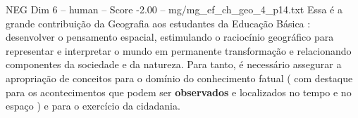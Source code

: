 \begin{textsample}{NEG Dim 6 – human – Score -2.00 – mg/mg\_ef\_ch\_geo\_4\_p14.txt}  \label{ex:f6_neg_019}
Essa é a grande contribuição da Geografia aos estudantes da Educação Básica : desenvolver o pensamento espacial, estimulando o raciocínio geográfico para representar e interpretar o mundo em permanente transformação e relacionando componentes da sociedade e da natureza.
Para tanto, é necessário assegurar a apropriação de conceitos para o domínio do conhecimento fatual ( com destaque para os acontecimentos que podem ser \textbf{observados} e localizados no tempo e no espaço ) e para o exercício da cidadania.

\end{textsample}
